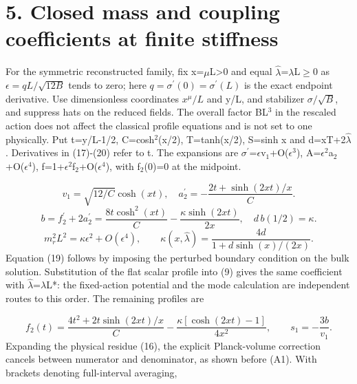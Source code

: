 \documentclass[11pt,a4paper]{article}
\begin{document}
\section*{5. Closed mass and coupling coefficients at finite stiffness}
For the symmetric reconstructed family, fix x=\ensuremath{\mu}L>0 and equal \ensuremath{\hat{\lambda}}=\ensuremath{\lambda}L\ensuremath{\geq}0 as \ensuremath{\epsilon=qL/\sqrt{12B}} tends to zero; here \ensuremath{q=\sigma^{\prime}(0)=\sigma^{\prime}(L)} is the exact endpoint derivative. Use dimensionless coordinates \ensuremath{x^\mu/L} and y/L, and stabilizer \ensuremath{\sigma/\sqrt{B}}, and suppress hats on the reduced fields. The overall factor BL\ensuremath{{}^{3}} in the rescaled action does not affect the classical profile equations and is not set to one physically. Put t=y/L-1/2, C=cosh\ensuremath{{}^{2}}(x/2), T=tanh(x/2), S=sinh x and d=xT+2\ensuremath{\hat{\lambda}}. Derivatives in (17)-(20) refer to t. The expansions are \ensuremath{\sigma}\ensuremath{{}^{\prime}}=\ensuremath{\epsilon}v\ensuremath{{}_{1}}+O(\ensuremath{\epsilon}\ensuremath{{}^{3}}), A=\ensuremath{\epsilon}\ensuremath{{}^{2}}a\ensuremath{{}_{2}}+O(\ensuremath{\epsilon}\ensuremath{{}^{4}}), f=1+\ensuremath{\epsilon}\ensuremath{{}^{2}}f\ensuremath{{}_{2}}+O(\ensuremath{\epsilon}\ensuremath{{}^{4}}), with f\ensuremath{{}_{2}}(0)=0 at the midpoint.

\begin{equation}
v_1=\sqrt{12/C}\cosh(xt),\quad a_2^\prime=-\frac{2t+\sinh(2xt)/x}{C}.\tag{17}
\end{equation}
\begin{equation}
b=f_2^\prime+2a_2^\prime=\frac{8t\cosh^2(xt)}{C}-\frac{\kappa\sinh(2xt)}{2x},\quad d\,b(1/2)=\kappa.\tag{18}
\end{equation}
\begin{equation}
m_r^2L^2=\kappa\epsilon^2+O(\epsilon^4),\qquad \kappa(x,\widehat\lambda)=\frac{4d}{1+d\sinh(x)/(2x)}.\tag{19}
\end{equation}
Equation (19) follows by imposing the perturbed boundary condition on the bulk solution. Substitution of the flat scalar profile into (9) gives the same coefficient with \ensuremath{\hat{\lambda}}=\ensuremath{\lambda}L*: the fixed-action potential and the mode calculation are independent routes to this order. The remaining profiles are

\begin{equation}
f_2(t)=\frac{4t^2+2t\sinh(2xt)/x}{C}-\frac{\kappa[\cosh(2xt)-1]}{4x^2},\qquad s_1=-\frac{3b}{v_1}.\tag{20}
\end{equation}
Expanding the physical residue (16), the explicit Planck-volume correction cancels between numerator and denominator, as shown before (A1). With brackets denoting full-interval averaging,
\end{document}
